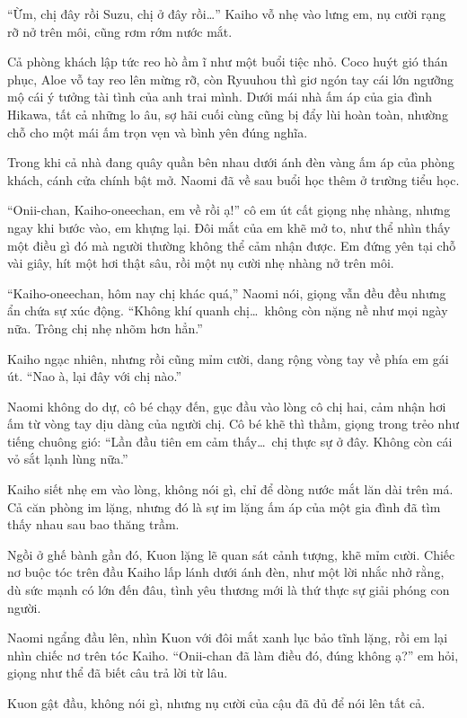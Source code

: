﻿\documentclass[../main.tex]{subfiles}
\begin{document}
``Ừm, chị đây rồi Suzu, chị ở đây rồi\dots'' Kaiho vỗ nhẹ vào lưng em, nụ cười rạng rỡ nở trên môi, cũng rơm rớm nước mắt.

Cả phòng khách lập tức reo hò ầm ĩ như một buổi tiệc nhỏ. Coco huýt gió thán phục, Aloe vỗ tay reo lên mừng rỡ, còn Ryuuhou thì giơ ngón tay cái lớn ngưỡng mộ cái ý tưởng tài tình của anh trai mình. Dưới mái nhà ấm áp của gia đình Hikawa, tất cả những lo âu, sợ hãi cuối cùng cũng bị đẩy lùi hoàn toàn, nhường chỗ cho một mái ấm trọn vẹn và bình yên đúng nghĩa.

\omk

Trong khi cả nhà đang quây quần bên nhau dưới ánh đèn vàng ấm áp của phòng khách, cánh cửa chính bật mở. Naomi đã về sau buổi học thêm ở trường tiểu học.

``Onii-chan, Kaiho-oneechan, em về rồi ạ!'' cô em út cất giọng nhẹ nhàng, nhưng ngay khi bước vào, em khựng lại. Đôi mắt của em khẽ mở to, như thể nhìn thấy một điều gì đó mà người thường không thể cảm nhận được. Em đứng yên tại chỗ vài giây, hít một hơi thật sâu, rồi một nụ cười nhẹ nhàng nở trên môi.

``Kaiho-oneechan, hôm nay chị khác quá,'' Naomi nói, giọng vẫn đều đều nhưng ẩn chứa sự xúc động. ``Không khí quanh chị\dots\ không còn nặng nề như mọi ngày nữa. Trông chị nhẹ nhõm hơn hẳn.''

Kaiho ngạc nhiên, nhưng rồi cũng mỉm cười, dang rộng vòng tay về phía em gái út. ``Nao à, lại đây với chị nào.''

Naomi không do dự, cô bé chạy đến, gục đầu vào lòng cô chị hai, cảm nhận hơi ấm từ vòng tay dịu dàng của người chị. Cô bé khẽ thì thầm, giọng trong trẻo như tiếng chuông gió: ``Lần đầu tiên em cảm thấy\dots\ chị thực sự ở đây. Không còn cái vỏ sắt lạnh lùng nữa.''

Kaiho siết nhẹ em vào lòng, không nói gì, chỉ để dòng nước mắt lăn dài trên má. Cả căn phòng im lặng, nhưng đó là sự im lặng ấm áp của một gia đình đã tìm thấy nhau sau bao thăng trầm.

Ngồi ở ghế bành gần đó, Kuon lặng lẽ quan sát cảnh tượng, khẽ mỉm cười. Chiếc nơ buộc tóc trên đầu Kaiho lấp lánh dưới ánh đèn, như một lời nhắc nhở rằng, dù sức mạnh có lớn đến đâu, tình yêu thương mới là thứ thực sự giải phóng con người.

Naomi ngẩng đầu lên, nhìn Kuon với đôi mắt xanh lục bảo tĩnh lặng, rồi em lại nhìn chiếc nơ trên tóc Kaiho. ``Onii-chan đã làm điều đó, đúng không ạ?'' em hỏi, giọng như thể đã biết câu trả lời từ lâu.

Kuon gật đầu, không nói gì, nhưng nụ cười của cậu đã đủ để nói lên tất cả.
\end{document}
